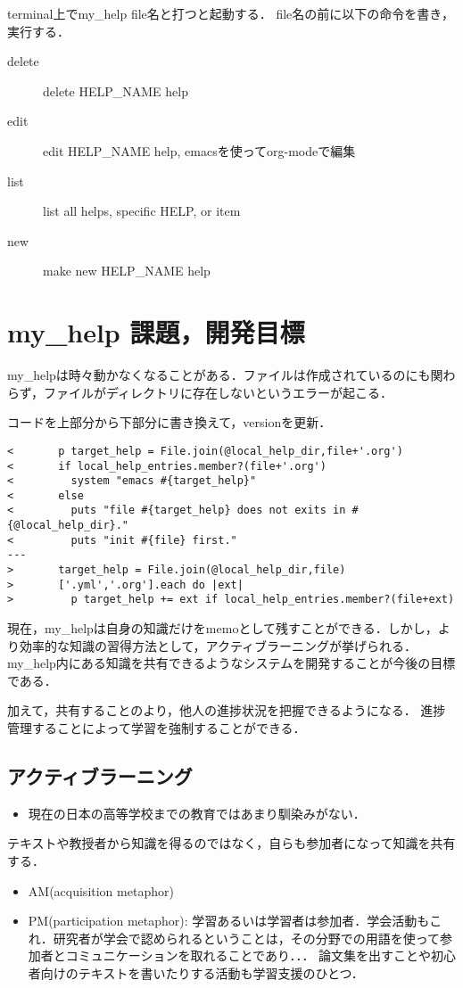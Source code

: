 \documentclass[a4j,twocolumn]{jsarticle}
\begin{document}
terminal上でmy\_help file名と打つと起動する．
file名の前に以下の命令を書き，実行する．

\begin{description}
\item[{delete}] delete HELP\_NAME help
\item[{edit}] edit HELP\_NAME help, 
emacsを使ってorg-modeで編集
\item[{list}] list all helps, specific HELP, or item
\item[{new}] make new HELP\_NAME help
\end{description}

\section{my\_help 課題，開発目標}
\label{sec-3}

my\_helpは時々動かなくなることがある．ファイルは作成されているのにも関わらず，ファイルがディレクトリに存在しないというエラーが起こる．

コードを上部分から下部分に書き換えて，versionを更新．


\begin{lstlisting}[caption=hogehoge,label=hoge]
<       p target_help = File.join(@local_help_dir,file+'.org')
<       if local_help_entries.member?(file+'.org')
<         system "emacs #{target_help}"
<       else
<         puts "file #{target_help} does not exits in #{@local_help_dir}."
<         puts "init #{file} first."
---
>       target_help = File.join(@local_help_dir,file)
>       ['.yml','.org'].each do |ext|
>         p target_help += ext if local_help_entries.member?(file+ext)
\end{lstlisting}

現在，my\_helpは自身の知識だけをmemoとして残すことができる．しかし，より効率的な知識の習得方法として，アクティブラーニングが挙げられる．
my\_help内にある知識を共有できるようなシステムを開発することが今後の目標である．

加えて，共有することのより，他人の進捗状況を把握できるようになる．
進捗管理することによって学習を強制することができる．

\subsection{アクティブラーニング}
\label{sec-3-1}
\begin{itemize}
\item 現在の日本の高等学校までの教育ではあまり馴染みがない．
\end{itemize}
テキストや教授者から知識を得るのではなく，自らも参加者になって知識を共有する．
\begin{itemize}
\item AM(acquisition metaphor)
\item PM(participation metaphor): 学習あるいは学習者は参加者．学会活動もこれ．研究者が学会で認められるということは，その分野での用語を使って参加者とコミュニケーションを取れることであり．．．
論文集を出すことや初心者向けのテキストを書いたりする活動も学習支援のひとつ．
\end{itemize}
\end{document}
